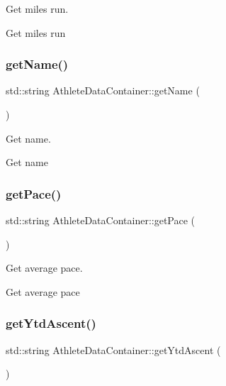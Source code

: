 Get miles run. 

Get miles run \mbox{\label{classAthleteDataContainer_a5a161d7bd2393b0c5fe025b191008ffc}} 
\subsubsection{\texorpdfstring{getName()}{getName()}}
{\footnotesize\ttfamily std\+::string Athlete\+Data\+Container\+::get\+Name (\begin{DoxyParamCaption}{ }\end{DoxyParamCaption})}



Get name. 

Get name \mbox{\label{classAthleteDataContainer_a9176f9236ca28e4885da7359d7b62587}} 
\subsubsection{\texorpdfstring{getPace()}{getPace()}}
{\footnotesize\ttfamily std\+::string Athlete\+Data\+Container\+::get\+Pace (\begin{DoxyParamCaption}{ }\end{DoxyParamCaption})}



Get average pace. 

Get average pace \mbox{\label{classAthleteDataContainer_a44c5e68a3fc070fc351539d96e43d118}} 
\subsubsection{\texorpdfstring{getYtdAscent()}{getYtdAscent()}}
{\footnotesize\ttfamily std\+::string Athlete\+Data\+Container\+::get\+Ytd\+Ascent (\begin{DoxyParamCaption}{ }\end{DoxyParamCaption})}




